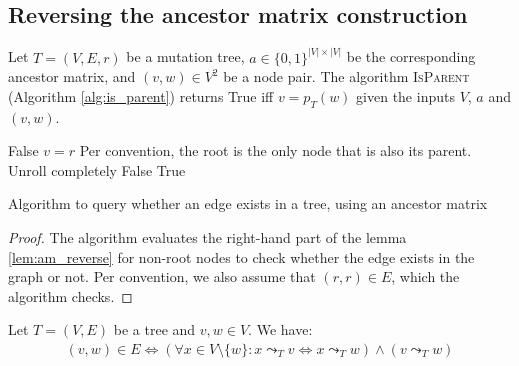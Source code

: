 \subsection{Reversing the ancestor matrix construction}


\begin{theorem}
    \label{theo:am_reverse}
    Let $T=(V, E, r)$ be a mutation tree, $a \in \{0, 1\}^{|V| \times |V|}$ be the corresponding ancestor matrix, and $(v, w) \in V^2$ be a node pair. The algorithm \textsc{IsParent} (Algorithm \ref{alg:is_parent}) returns True iff $v = p_T(w)$ given the inputs $V$, $a$ and $(v,w)$.
\end{theorem}

\begin{algorithm}
    \begin{algorithmic}[1]
                \State \Return False
            \EndIf
                \State \Return $v = r$ \Comment Per convention, the root is the only node that is also its parent.
            \EndIf
             \Comment Unroll completely
                    \State \Return False
                \EndIf
            \EndFor
            \State \Return True
        \EndFunction
    \end{algorithmic}
    \caption{Algorithm to query whether an edge exists in a tree, using an ancestor matrix}
    \label{alg:is_parent}
\end{algorithm}

\begin{proof}
    The algorithm evaluates the right-hand part of the lemma \ref{lem:am_reverse} for non-root nodes to check whether the edge exists in the graph or not. Per convention, we also assume that $(r,r) \in E$, which the algorithm checks.
\end{proof}

\begin{lemma}
    \label{lem:am_reverse}
    Let $T = (V, E)$ be a tree and $v, w \in V$. We have:
    \begin{align*}
        (v, w) \in E \Leftrightarrow (\forall x \in V \setminus \{w\}: x \leadsto_T v \Leftrightarrow x \leadsto_T w) \wedge (v \leadsto_T w)
    \end{align*}
\end{lemma}

